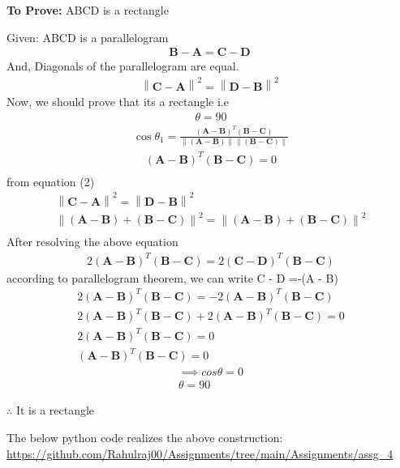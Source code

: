 \documentclass[10pt, a4paper]{article}
\providecommand{\norm}[1]{\left\lVert#1\right\rVert}
\providecommand{\brak}[1]{\ensuremath{\left(#1\right)}}
\let\vec\mathbf
\begin{document}
\vspace{.25 cm}
\textbf{To Prove:}
ABCD is a rectangle

 Given:
 ABCD is a parallelogram
\begin{align}
 \vec{B} - \vec{A}= \vec{C}-\vec{D}\
	\end{align}
	And, Diagonals of the parallelogram are equal.
\begin{align}
 \norm{\vec{C} - \vec{A}}^2= \norm{\vec{D}-\vec{B}}^2\
	\end{align}
 	Now, we should prove that its a rectangle i.e
\begin{align}
 \theta = 90
\end{align} 	
 \begin{align}
 \cos \theta_1 =\frac{\mathbf{(A-B)}^T  \mathbf{(B-C)}}{\norm{\vec{(A-B)}}\norm{\vec{(B-C)}}}
 \end{align}
\begin{align}
\brak{\vec{A}-\vec{B}}^T
\brak{\vec{B}-\vec{C}} = 0
\\
\end{align}
from equation (2) 
\begin{align*}
 \norm{\vec{C} - \vec{A}}^2= \norm{\vec{D}-\vec{B}}^2\\
 \norm{{(\vec{A-B}) + (\vec{B-C})}}^2 = \norm{{(\vec{A-B}) + (\vec{B-C})}}^2\\
\end{align*}
After resolving the above equation 
\begin{align}
2(\vec{A}-\vec{B})^T (\vec{B}-\vec{C})=2(\vec{C}-\vec{D})^T (\vec{B}-\vec{C}) 
\end{align}
according to parallelogram theorem, we can write C - D =-(A - B)
\begin{align}
2(\vec{A}-\vec{B})^T (\vec{B}-\vec{C})=-2(\vec{A}-\vec{B})^T (\vec{B}-\vec{C}) \\
2(\vec{A}-\vec{B})^T (\vec{B}-\vec{C})+2(\vec{A}-\vec{B})^T (\vec{B}-\vec{C}) =0 \\
2(\vec{A}-\vec{B})^T (\vec{B}-\vec{C})=0\\
(\vec{A}-\vec{B})^T (\vec{B}-\vec{C})=0
\end{align}
\begin{align}
\implies cos\theta = 0\\
\theta = 90
\end{align}
 	
$\therefore$ It is a rectangle

\vspace{1mm}
The below python code realizes the above construction:	\\
\url{https://github.com/Rahulraj00/Assignments/tree/main/Assignments/assg_4}

\end{document}
